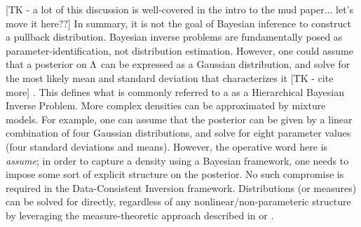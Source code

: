 \begin{ex}
[TK - a lot of this discussion is well-covered in the intro to the mud paper... let's move it here??]
In summary, it is not the goal of Bayesian inference to construct a pullback distribution.
Bayesian inverse problems are fundamentally posed as parameter-identification, not distribution estimation.
However, one could assume that a posterior on ${\Lambda}$ can be expressed as a Gaussian distribution, and solve for the most likely mean and standard deviation that characterizes it [TK - cite more] \cite{Smith}.
This defines what is commonly referred to a as a Hierarchical Bayesian Inverse Problem.
More complex densities can be approximated by mixture models.
For example, one can assume that the posterior can be given by a linear combination of four Gaussian distributions, and solve for eight parameter values (four standard deviations and means).
However, the operative word here is \emph{assume}; in order to capture a density using a Bayesian framework, one needs to impose some sort of explicit structure on the posterior.
No such compromise is required in the Data-Consistent Inversion framework.
Distributions (or measures) can be solved for directly, regardless of any nonlinear/non-parameteric structure by leveraging the measure-theoretic approach described in \cite{BE13} or \cite{BJW18}.

\end{ex}
